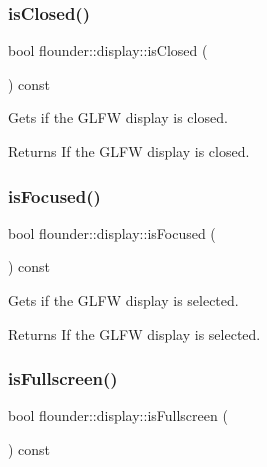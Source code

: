 \subsubsection{\texorpdfstring{is\+Closed()}{isClosed()}}
{\footnotesize\ttfamily bool flounder\+::display\+::is\+Closed (\begin{DoxyParamCaption}{ }\end{DoxyParamCaption}) const\hspace{0.3cm}{\ttfamily [inline]}}



Gets if the G\+L\+FW display is closed. 

\begin{DoxyReturn}{Returns}
If the G\+L\+FW display is closed. 
\end{DoxyReturn}
\mbox{\label{classflounder_1_1display_a197dd99a738c485bc6d941c592e8190b}} 
\subsubsection{\texorpdfstring{is\+Focused()}{isFocused()}}
{\footnotesize\ttfamily bool flounder\+::display\+::is\+Focused (\begin{DoxyParamCaption}{ }\end{DoxyParamCaption}) const\hspace{0.3cm}{\ttfamily [inline]}}



Gets if the G\+L\+FW display is selected. 

\begin{DoxyReturn}{Returns}
If the G\+L\+FW display is selected. 
\end{DoxyReturn}
\mbox{\label{classflounder_1_1display_acfae3246461b74303af0513aedbee9f1}} 
\subsubsection{\texorpdfstring{is\+Fullscreen()}{isFullscreen()}}
{\footnotesize\ttfamily bool flounder\+::display\+::is\+Fullscreen (\begin{DoxyParamCaption}{ }\end{DoxyParamCaption}) const\hspace{0.3cm}{\ttfamily [inline]}}



